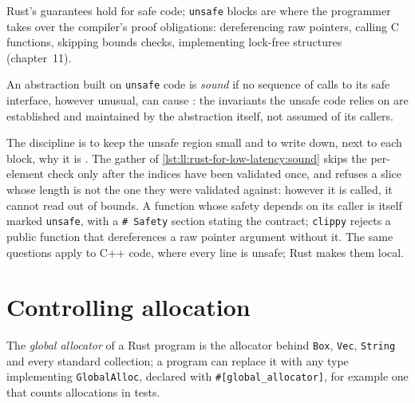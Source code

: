 Rust's guarantees hold for safe code; \texttt{unsafe} blocks are where the programmer takes over the compiler's proof
obligations: dereferencing raw pointers, calling C functions, skipping bounds checks, implementing lock-free structures
(chapter~11).

\begin{definition}\label{def:ll:rust-for-low-latency:sound}
An abstraction built on \texttt{unsafe} code is \emph{sound} if no sequence of calls to its safe
interface, however unusual, can cause : the invariants the unsafe code relies on are established and
maintained by the abstraction itself, not assumed of its callers.
\end{definition}

The discipline is to keep the unsafe region small and to write down, next to each block, why it is . The gather of
\cref{lst:ll:rust-for-low-latency:sound} skips the per-element check only after the indices have been validated once, and
refuses a slice whose length is not the one they were validated against: however it is called, it cannot read out of
bounds. A function whose safety depends on its caller is itself marked \texttt{unsafe}, with a \texttt{\# Safety} section
stating the contract; \texttt{clippy} rejects a public function that dereferences a raw pointer argument without it. The
same questions apply to C++ code, where every line is unsafe; Rust makes them local.

\label{lst:ll:rust-for-low-latency:sound}

\section{Controlling allocation}

\begin{definition}\label{def:ll:rust-for-low-latency:alloc}
The \emph{global allocator} of a Rust program is the allocator behind \texttt{Box}, \texttt{Vec},
\texttt{String} and every standard collection; a program can replace it with any type implementing \texttt{GlobalAlloc},
declared with \texttt{\#[global\_allocator]}, for example one that counts allocations in tests.
\end{definition}

